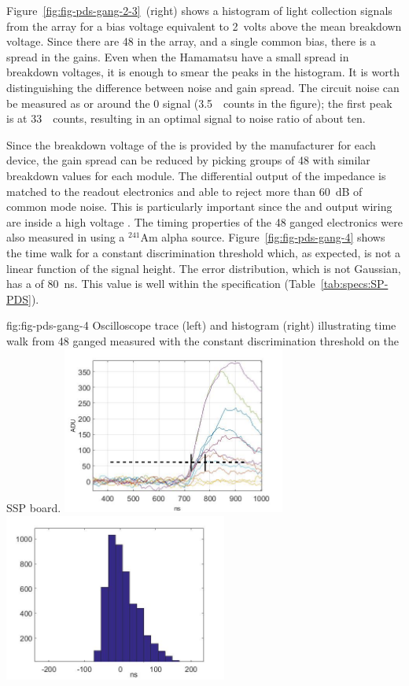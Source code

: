 Figure~\ref{fig:fig-pds-gang-2-3}~(right) shows a histogram of light collection signals from the array for a bias voltage equivalent to \SI{2}{volts} above the mean breakdown voltage. Since there are 48  in the array, and a single common bias, there is a spread in the gains. Even when the Hamamatsu  have a small spread in breakdown voltages, it is enough to smear the peaks in the histogram. It is worth distinguishing the difference between noise and gain spread. The circuit noise can be measured as  or  around the 0 \phel signal (\SI{3.5}{ counts} in the figure); the first \phel peak is at \SI{33}{ counts}, resulting in an optimal signal to noise ratio of about ten.

Since the breakdown voltage of the  is provided by the manufacturer for each device, the gain spread can be reduced by picking groups of 48  with similar breakdown values for each module. The differential output of the  impedance is matched to the readout electronics and able to reject more than \SI{60}{dB} of common mode noise. This is particularly important since the  and output wiring are inside a high voltage . The timing properties of the 48 ganged electronics were also measured in  using a $^{241}$Am alpha source. 
Figure~\ref{fig:fig-pds-gang-4} shows the time walk for a constant discrimination threshold which, as expected, is not a linear function of the signal height. The error distribution, which is not Gaussian, has a  of \SI{80}{ns}. This value is well within the  specification (Table~\ref{tab:specs:SP-PDS}).

\begin{dunefigure}
 {fig:fig-pds-gang-4}
 {Oscilloscope trace (left) and histogram (right) illustrating time walk from 48 ganged  measured with the constant discrimination threshold on the SSP board.}
\includegraphics[height=5.5cm]{graphics/pds-gang-time-walk.jpg}
\includegraphics[height=5.5cm]{graphics/pds-gang-time-walk-hist.jpg}
\end{dunefigure}


